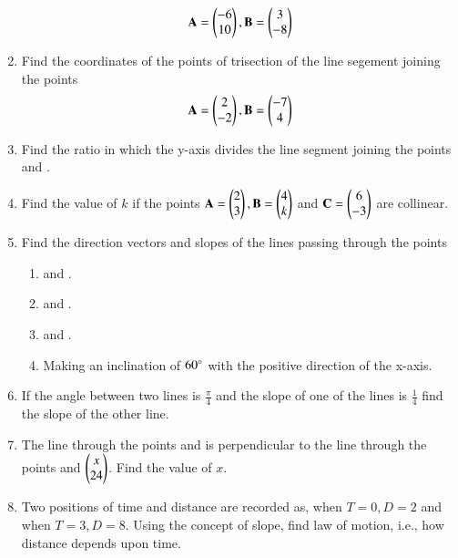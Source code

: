 \begin{enumerate}[label=\arabic*.,ref=\thesubsection.\theenumi]
%
\begin{align}
\mathbf{A} = \begin{pmatrix}-6\\10\end{pmatrix},
\mathbf{B} = \begin{pmatrix}3\\-8\end{pmatrix}
\end{align}
%
\item Find the coordinates of the points of trisection of the line segement joining the points
%
\begin{align}
\mathbf{A} = \begin{pmatrix}2\\-2\end{pmatrix},
\mathbf{B} = \begin{pmatrix}-7\\4\end{pmatrix}
\end{align}
%
\item Find the ratio in which the y-axis divides the line segment joining the points  and .
\item Find the value of $k$ if the points $\mathbf{A}=\begin{pmatrix}2\\3\end{pmatrix}, \mathbf{B}=\begin{pmatrix}4\\k\end{pmatrix}$ and $\mathbf{C}=\begin{pmatrix}6\\-3\end{pmatrix}$ are collinear.
\item Find the direction vectors and slopes of the lines passing through the points
%
\begin{enumerate}
\item {} and .
\item {} and .
\item {} and .
\item Making an inclination of $60\degree$ with the positive direction of the x-axis.
\end{enumerate}
%
\item If the angle between two lines is $\frac{\pi}{4}$ and the slope of one of the lines is $\frac{1}{4}$ find the slope of the other line.
\item The line through the points  and  is perpendicular to the line through the points  and $\begin{pmatrix}x\\24\end{pmatrix}$.  Find the value of $x$.
\item Two positions of time and distance are recorded as, when $T = 0, D = 2$ and when $T = 3, D = 8$. Using the concept of slope, find law of motion, i.e., how distance depends upon time.

\end{enumerate}
